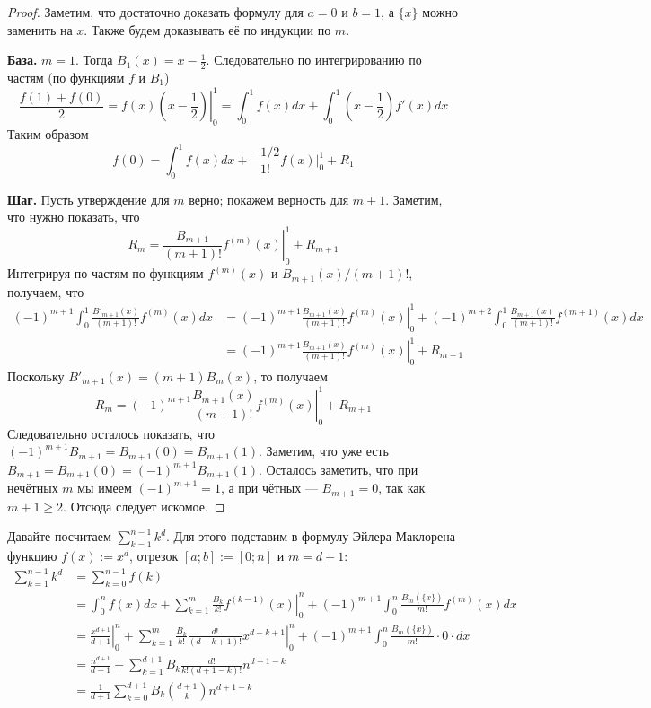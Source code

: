 \documentclass[12pt,a4paper]{article}
\begin{document}
    \begin{proof}
        Заметим, что достаточно доказать формулу для $a = 0$ и $b = 1$, а $\{x\}$ можно заменить на $x$. Также будем доказывать её по индукции по $m$.

        \textbf{База.} $m=1$. Тогда $B_1(x) = x - \frac{1}{2}$. Следовательно по интегрированию по частям (по функциям $f$ и $B_1$)
        \[\frac{f(1) + f(0)}{2} = \left.f(x)\left(x - \frac{1}{2}\right)\right|_0^1 = \int_0^1 f(x)dx + \int_0^1 \left(x - \frac{1}{2}\right)f'(x)dx\]
        Таким образом
        \[f(0) = \int_0^1 f(x)dx + \frac{-1/2}{1!} \left.f(x)\right|_0^1 + R_1\]

        \textbf{Шаг.} Пусть утверждение для $m$ верно; покажем верность для $m+1$. Заметим, что нужно показать, что
        \[R_m = \left.\frac{B_{m+1}}{(m+1)!} f^{(m)}(x)\right|_0^1 + R_{m+1}\]
        Интегрируя по частям по функциям $f^{(m)}(x)$ и $B_{m+1}(x)/(m+1)!$, получаем, что
        \begin{align*}
            (-1)^{m+1}\int_0^1 \frac{B'_{m+1}(x)}{(m+1)!}f^{(m)}(x)dx
            &= (-1)^{m+1} \left.\frac{B_{m+1}(x)}{(m+1)!} f^{(m)}(x) \right|_0^1 + (-1)^{m+2} \int_0^1 \frac{B_{m+1}(x)}{(m+1)!}f^{(m+1)}(x)dx\\
            &= (-1)^{m+1} \left.\frac{B_{m+1}(x)}{(m+1)!} f^{(m)}(x) \right|_0^1 + R_{m+1}
        \end{align*}
        Поскольку $B'_{m+1}(x) = (m+1) B_m(x)$, то получаем
        \[R_m = (-1)^{m+1} \left.\frac{B_{m+1}(x)}{(m+1)!} f^{(m)}(x) \right|_0^1 + R_{m+1}\]
        Следовательно осталось показать, что $(-1)^{m+1}B_{m+1} = B_{m+1}(0) = B_{m+1}(1)$. Заметим, что уже есть $B_{m+1} = B_{m+1}(0) = (-1)^{m+1} B_{m+1}(1)$. Осталось заметить, что при нечётных $m$ мы имеем $(-1)^{m+1} = 1$, а при чётных --- $B_{m+1} = 0$, так как $m+1 \geqslant 2$. Отсюда следует искомое.
    \end{proof}

    \begin{example}
        Давайте посчитаем $\sum_{k=1}^{n-1} k^d$. Для этого подставим в формулу Эйлера-Маклорена функцию $f(x) := x^d$, отрезок $[a; b] := [0; n]$ и $m = d+1$:
        \begin{align*}
            \sum_{k=1}^{n-1} k^d
            &= \sum_{k=0}^{n-1} f(k)\\
            &=
                \int_0^n f(x) dx
                + \sum_{k=1}^m \left.\frac{B_k}{k!} f^{(k-1)}(x)\right|_0^n
                + (-1)^{m+1} \int_0^n \frac{B_m(\{x\})}{m!} f^{(m)}(x) dx\\
            &=
                \left.\frac{x^{d+1}}{d+1}\right|_0^n
                + \sum_{k=1}^m \left.\frac{B_k}{k!} \frac{d!}{(d-k+1)!} x^{d-k+1}\right|_0^n
                + (-1)^{m+1} \int_0^n \frac{B_m(\{x\})}{m!} \cdot 0 \cdot dx\\
            &=
                \frac{n^{d+1}}{d+1}
                + \sum_{k=1}^{d+1} B_k \frac{d!}{k! (d+1-k)!} n^{d+1-k}\\
            &= \frac{1}{d+1} \sum_{k=0}^{d+1} B_k \binom{d+1}{k} n^{d+1-k}
        \end{align*}
    \end{example}
\end{document}
